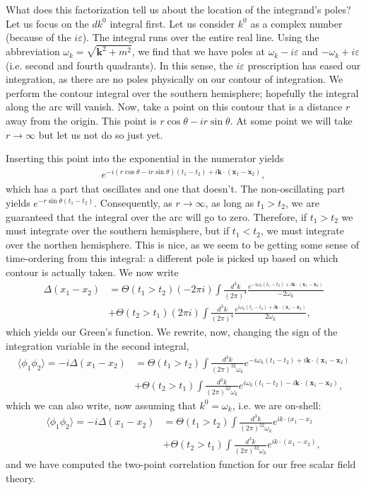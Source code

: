 \documentclass{../mathnotes}
\begin{document}
What does this factorization tell us about the location of the integrand's poles? Let us focus on the $dk^0$ integral first. Let us consider $k^0$ as
a complex number (because of the $i\varepsilon$). The integral runs over the entire real line. Using the abbreviation $\omega_k=\sqrt{\mathbf{k}^2+m^2}$,
we find that we have poles at $\omega_k-i\varepsilon$ and $-\omega_k+i\varepsilon$ (i.e. second and fourth quadrants). In this sense, the
$i\varepsilon$ prescription has eased our integration, as there are no poles physically on our contour of integration. We perform the contour integral
over the southern hemisphere; hopefully the integral along the arc will vanish. Now, take a point on this contour that is a distance $r$ away from the origin.
This point is $r\cos\theta-ir\sin\theta$. At some point we will take $r\to\infty$ but let us not do so just yet.

Inserting this point into the exponential in the numerator yields
\begin{align*}
    e^{-i(r\cos\theta-ir\sin\theta)(t_1-t_2)+i\mathbf{k}\cdot (\mathbf{x}_1-\mathbf{x}_2)},
\end{align*}
which has a part that oscillates and one that doesn't. The non-oscillating part yields $e^{-r\sin\theta(t_1-t_2)}$. Consequently, as $r\to\infty$,
as long as $t_1>t_2$, we are guaranteed that the integral over the arc will go to zero. Therefore, if $t_1>t_2$ we must integrate over the southern
hemisphere, but if $t_1<t_2$, we must integrate over the northen hemisphere. This is nice, as we seem to be getting some sense of time-ordering from
this integral: a different pole is picked up based on which contour is actually taken. We now write
\begin{align*}
    \Delta(x_1-x_2)&=\Theta(t_1>t_2)(-2\pi i)\int\frac{d^3k}{(2\pi)^4}\frac{e^{-i\omega_k(t_1-t_2)+i\mathbf{k}\cdot(\mathbf{x}_1-\mathbf{x}_2)}}{-2\omega_k}\\
    &+\Theta(t_2>t_1)(2\pi i)\int\frac{d^3k}{(2\pi)^4}\frac{e^{i\omega_k(t_1-t_2)+i\mathbf{k}\cdot(\mathbf{x}_1-\mathbf{x}_2)}}{2\omega_k},
\end{align*}
which yields our Green's function. We rewrite, now, changing the sign of the integration variable in the second integral,
\begin{align*}
    \langle\phi_1\phi_2\rangle=-i\Delta(x_1-x_2)&=\Theta(t_1>t_2)\int\frac{d^3k}{(2\pi)^32\omega_k}e^{-i\omega_k(t_1-t_2)+i\mathbf{k}\cdot(\mathbf{x}_1-\mathbf{x}_2)}\\
    &+\Theta(t_2>t_1)\int\frac{d^3k}{(2\pi)^32\omega_k}e^{i\omega_k(t_1-t_2)-i\mathbf{k}\cdot(\mathbf{x}_1-\mathbf{x}_2)},
\end{align*}
which we can also write, now assuming that $k^0=\omega_k$, i.e. we are on-shell:
\begin{align*}
    \langle\phi_1\phi_2\rangle=-i\Delta(x_1-x_2)&=\Theta(t_1>t_2)\int\frac{d^3k}{(2\pi)^32\omega_k}e^{ik\cdot(x_1-x_2}\\
    &+\Theta(t_2>t_1)\int\frac{d^3k}{(2\pi)^32\omega_k}e^{ik\cdot(x_1-x_2)},
\end{align*}
and we have computed the two-point correlation function for our free scalar field theory.
\end{document}
